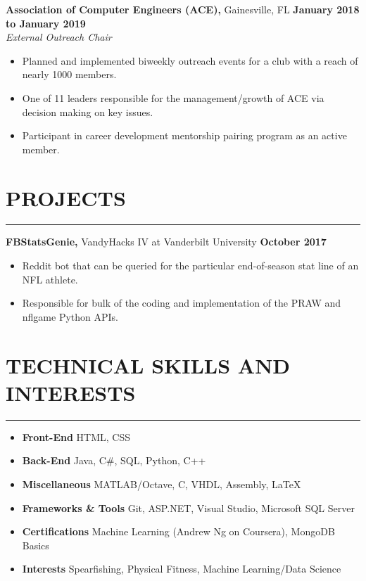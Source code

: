 \documentclass[11pt]{article} %
\begin{document}
		\noindent \textbf{Association of Computer Engineers (ACE),} Gainesville, FL \hfill\textbf{January 2018 to January 2019}\\
		\textit{External Outreach Chair}
		\begin{itemize}[noitemsep,nolistsep, label={-}]
			\item Planned and implemented biweekly outreach events for a club with a reach of nearly 1000 members.
			\item One of 11 leaders responsible for the management/growth of ACE via decision making on key issues.
			\item Participant in career development mentorship pairing program as an active member.
		\end{itemize}
		\vspace{.1cm}
	
	\section*{PROJECTS}
		\hrule \relax
		\vspace{.4cm}
		
		\noindent \textbf{FBStatsGenie,} VandyHacks IV at Vanderbilt University \hfill\textbf{October 2017}
		\begin{itemize}[noitemsep,nolistsep, label={-}]
			\item Reddit bot that can be queried for the particular end-of-season stat line of an NFL athlete.
			\item Responsible for bulk of the coding and implementation of the PRAW and nflgame Python APIs.
		\end{itemize}
		
		\vspace{.1cm}
	
	\section*{TECHNICAL SKILLS AND INTERESTS}
		\hrule \relax
		\vspace{.4cm}
		
		\begin{itemize}[noitemsep,nolistsep, label={}]
			\item \textbf{Front-End}                   \tabto*{5cm} HTML, CSS
			\item \textbf{Back-End}                    \tabto*{5cm} Java, C\#,  SQL, Python, C++
			\item \textbf{Miscellaneous}             \tabto*{5cm} MATLAB/Octave, C, VHDL, Assembly, \LaTeX
			\item \textbf{Frameworks \& Tools}  \tabto*{5cm} Git, ASP.NET, Visual Studio, Microsoft SQL Server
			\item \textbf{Certifications}			   \tabto*{5cm} Machine Learning (Andrew Ng on Coursera), MongoDB Basics
			\item \textbf{Interests}                     \tabto*{5cm} Spearfishing, Physical Fitness, Machine Learning/Data Science
		\end{itemize}
		
		\vspace{.1cm}
	
\end{document}
